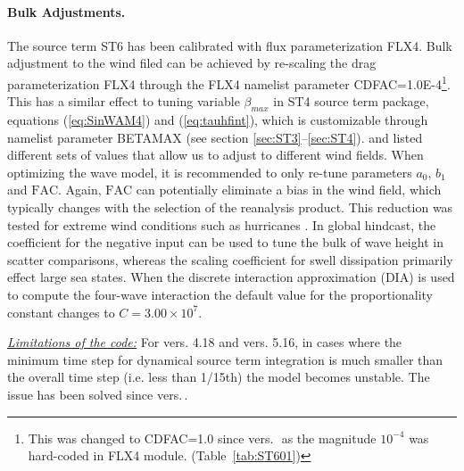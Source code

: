 \paragraph{Bulk Adjustments.} The source term
{\code ST6} has been calibrated with flux parameterization {\code FLX4}.
Bulk adjustment to the wind filed can be achieved by re-scaling the drag
parameterization {\code FLX4} through the {\F FLX4} namelist parameter {\code
 CDFAC=1.0E-4}\footnote{This was changed to {\code CDFAC=1.0} since vers.\,\WWver\ as the magnitude $10^{-4}$ was hard-coded
in {\code FLX4} module. (Table~\ref{tab:ST601})}. This has a similar effect to tuning variable
$\beta_{max}$ in {\code ST4} source term package, equations
(\ref{eq:SinWAM4}) and (\ref{eq:tauhfint}), which is customizable
through namelist parameter {\code BETAMAX} (see section
\ref{sec:ST3}--\ref{sec:ST4}). \citet{pro:Aea11} and \citet{art:RA13}
listed different sets of values that allow us to adjust to different
wind fields. When optimizing the wave model, it is recommended to
only re-tune parameters $a_0$, $b_1$ and $\mathrm{FAC}$. Again, $\mathrm{FAC}$
can potentially eliminate a bias in the wind field, which typically changes
with the selection of the reanalysis product. This reduction was tested
for extreme wind conditions such as hurricanes \citep{art:ZBRY15}.  In global
hindcast, the coefficient for the negative input can be used to tune
the bulk of wave height in scatter comparisons, whereas the scaling
coefficient for swell dissipation primarily effect large sea states.
When the discrete interaction approximation ({\code DIA}) is used to compute the four-wave
interaction the default value for the proportionality constant changes to
$C=3.00\times10^7$.

\textrm{\textit{\underline{Limitations of the code:}}} For vers. 4.18 and
vers. 5.16, in cases where the minimum time step for dynamical source term
integration is much smaller than the overall time step (i.e. less than
1/15th) the model becomes unstable. The issue has been solved since vers.\,\WWver.
